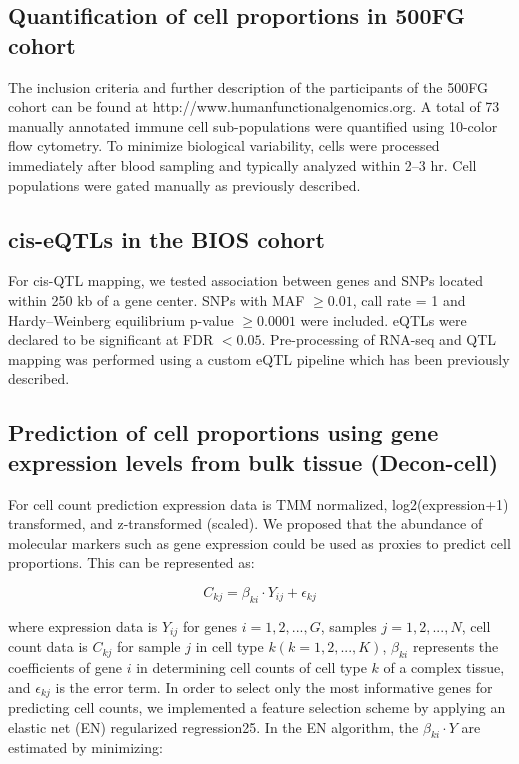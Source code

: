 \subsection{Quantification of cell proportions in 500FG cohort}
The inclusion criteria and further description of the participants of the 500FG cohort can be found at http://www.humanfunctionalgenomics.org. A total of 73 manually annotated immune cell sub-populations were quantified using 10-color flow cytometry. To minimize biological variability, cells were processed immediately after blood sampling and typically analyzed within 2–3 hr. Cell populations were gated manually as previously described\cite{aguirre-gamboaDifferentialEffectsEnvironmental2016}.

\subsection{cis-eQTLs in the BIOS cohort}
For cis-QTL mapping, we tested association between genes and SNPs located within 250 kb of a gene center. SNPs with MAF $\geq 0.01$, call rate = 1 and Hardy–Weinberg equilibrium p-value $\geq 0.0001$ were included. eQTLs were declared to be significant at FDR $< 0.05$. Pre-processing of RNA-seq and QTL mapping was performed using a custom eQTL pipeline which has been previously described\cite{zhernakovaIdentificationContextdependentExpression2017}.

\subsection{Prediction of cell proportions using gene expression levels from bulk tissue (Decon-cell)}
For cell count prediction expression data is TMM normalized, log2(expression+1) transformed, and z-transformed (scaled). We proposed that the abundance of molecular markers such as gene expression could be used as proxies to predict cell proportions. This can be represented as:

\begin{equation}
C_{kj} = \beta_{ki} \cdot Y_{ij} + \epsilon_{kj}
\end{equation}

where expression data is $Y_{ij}$ for genes $i = 1, 2,..., G$, samples $j = 1, 2, ..., N$, cell count data is $C_{kj}$ for sample $j$ in cell type $k (k = 1, 2, ..., K)$, $\beta_{ki}$ represents the coefficients of gene $i$ in determining cell counts of cell type $k$ of a complex tissue, and $\epsilon_{kj}$ is the error term.
In order to select only the most informative genes for predicting cell counts, we implemented a feature selection scheme by applying an elastic net (EN) regularized regression25. In the EN algorithm, the $\beta_{ki} \cdot Y$ are estimated by minimizing:

